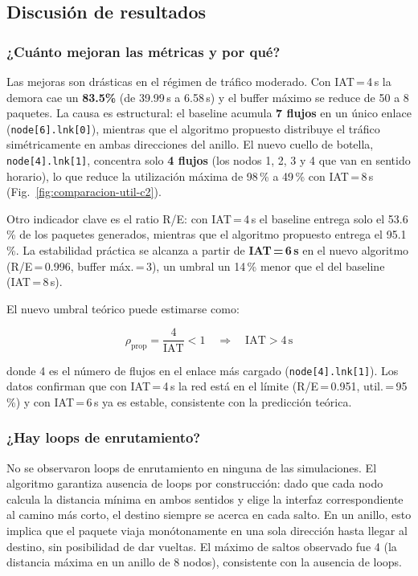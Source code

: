 \documentclass[10pt,letterpaper,twocolumn]{article}
\begin{document}
\subsection{Discusión de resultados}

\subsubsection*{¿Cuánto mejoran las métricas y por qué?}

Las mejoras son drásticas en el régimen de tráfico moderado. Con
IAT\,=\,4\,s la demora cae un \textbf{83.5\%} (de 39.99\,s a 6.58\,s)
y el buffer máximo se reduce de 50 a 8 paquetes. La causa es estructural:
el baseline acumula \textbf{7 flujos} en un único enlace
(\texttt{node[6].lnk[0]}), mientras que el algoritmo propuesto
distribuye el tráfico simétricamente en ambas direcciones del anillo.
El nuevo cuello de botella, \texttt{node[4].lnk[1]}, concentra solo
\textbf{4 flujos} (los nodos 1, 2, 3 y 4 que van en sentido horario),
lo que reduce la utilización máxima de 98\,\% a 49\,\% con IAT\,=\,8\,s
(Fig.~\ref{fig:comparacion-util-c2}).

Otro indicador clave es el ratio R/E: con IAT\,=\,4\,s el baseline
entrega solo el 53.6\,\% de los paquetes generados, mientras que el
algoritmo propuesto entrega el 95.1\,\%. La estabilidad práctica
se alcanza a partir de \textbf{IAT\,=\,6\,s} en el nuevo algoritmo
(R/E\,=\,0.996, buffer máx.\,=\,3), un umbral un 14\,\% menor que el
del baseline (IAT\,=\,8\,s).

El nuevo umbral teórico puede estimarse como:

\begin{equation}
  \rho_{\mathrm{prop}} = \frac{4}{\mathrm{IAT}} < 1
  \quad \Rightarrow \quad \mathrm{IAT} > 4\,\mathrm{s}
  \label{eq:umbral-nuevo}
\end{equation}

\noindent donde 4 es el número de flujos en el enlace más cargado
(\texttt{node[4].lnk[1]}). Los datos confirman que con IAT\,=\,4\,s la
red está en el límite (R/E\,=\,0.951, util.\,=\,95\,\%) y con
IAT\,=\,6\,s ya es estable, consistente con la predicción teórica.

\subsubsection*{¿Hay loops de enrutamiento?}

No se observaron loops de enrutamiento en ninguna de las simulaciones.
El algoritmo garantiza ausencia de loops por construcción: dado que cada
nodo calcula la distancia mínima en ambos sentidos y elige la interfaz
correspondiente al camino más corto, el destino siempre se acerca en
cada salto. En un anillo, esto implica que el paquete viaja
monótonamente en una sola dirección hasta llegar al destino, sin
posibilidad de dar vueltas. El máximo de saltos observado fue 4 (la
distancia máxima en un anillo de 8 nodos), consistente con la ausencia
de loops.
\end{document}
